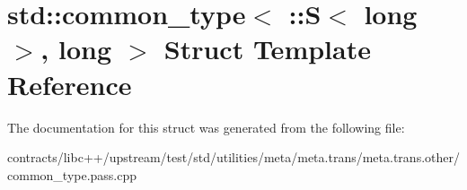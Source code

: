 \hypertarget{structstd_1_1common__type_3_01_1_1_s_3_01long_01_4_00_01long_01_4}{}\section{std\+:\+:common\+\_\+type$<$ \+:\+:S$<$ long $>$, long $>$ Struct Template Reference}
\label{structstd_1_1common__type_3_01_1_1_s_3_01long_01_4_00_01long_01_4}


The documentation for this struct was generated from the following file\+:\begin{DoxyCompactItemize}
\item 
contracts/libc++/upstream/test/std/utilities/meta/meta.\+trans/meta.\+trans.\+other/common\+\_\+type.\+pass.\+cpp\end{DoxyCompactItemize}
